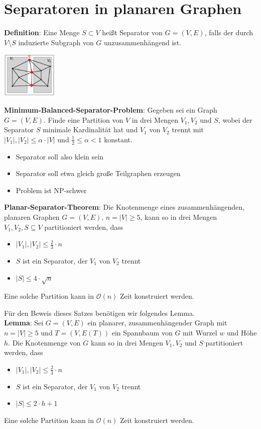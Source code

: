 \section{Separatoren in planaren Graphen}

\textbf{Definition}: Eine Menge $S\subset V$ heißt Separator von $G = (V, E)$, falls der durch $V\setminus S$ induzierte Subgraph von $G$ unzusammenhängend ist.

\begin{center}
	\includegraphics[width=0.2\textwidth]{images/separator.png}
\end{center}
\bigskip
\textbf{Minimum-Balanced-Separator-Problem}: Gegeben sei ein Graph $G = (V, E)$. Finde eine Partition von $V$ in drei Mengen $V_1, V_2$ und $S$, wobei der Separator $S$ minimale Kardinalität hat und $V_1$ von $V_2$ trennt mit $|V_1|,|V_2|\leq\alpha\cdot|V|$ und $\frac{1}{2}\leq\alpha<1$ konstant.
\begin{itemize}
	\item Separator soll also klein sein
	\item Separator soll etwa gleich große Teilgraphen erzeugen
	\item Problem ist NP-schwer
\end{itemize}
\bigskip
\textbf{Planar-Separator-Theorem}: Die Knotenmenge eines zusammenhängenden, planaren Graphen $G = (V, E)$, $n = |V| \geq 5$, kann so in drei Mengen $V_1, V_2, S\subseteq V$ partitioniert werden, dass
\begin{itemize}
	\item $|V_1|,|V_2|\leq\frac{2}{3}\cdot n$
	\item $S$ ist ein Separator, der $V_1$ von $V_2$ trennt
	\item $|S| \leq 4\cdot\sqrt{n}$
\end{itemize}
Eine solche Partition kann in $\mathcal{O}(n)$ Zeit konstruiert werden.

Für den Beweis dieses Satzes benötigen wir folgendes Lemma.\\

\textbf{Lemma}: Sei $G = (V, E)$ ein planarer, zusammenhängender Graph mit $n = |V| \geq 5$ und $T=(V,E(T))$ ein Spannbaum von $G$ mit Wurzel $w$ und Höhe $h$. Die Knotenmenge von $G$ kann so in drei Mengen $V_1, V_2$ und $S$ partitioniert werden, dass
\begin{itemize}
	\item $|V_1|,|V_2|\leq\frac{2}{3}\cdot n$
	\item $S$ ist ein Separator, der $V_1$ von $V_2$ trennt
	\item $|S|\leq 2\cdot h+1$
\end{itemize}
Eine solche Partition kann in $\mathcal{O}(n)$ Zeit konstruiert werden.

